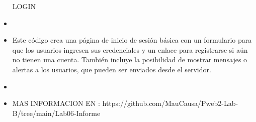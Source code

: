 \documentclass{article}
\begin{document}
\begin{itemize}
      LOGIN
     \item[ ]{}

     \item Este código crea una página de inicio de sesión básica con un formulario para que los usuarios ingresen sus credenciales y un enlace para registrarse si aún no tienen una cuenta. También incluye la posibilidad de mostrar mensajes o alertas a los usuarios, que pueden ser enviados desde el servidor.

    \item[ ]{}
 

    \item MAS INFORMACION EN :  https://github.com/MauCausa/Pweb2-Lab-B/tree/main/Lab06-Informe
       
      
           
	\end{itemize}
		
\end{document}
